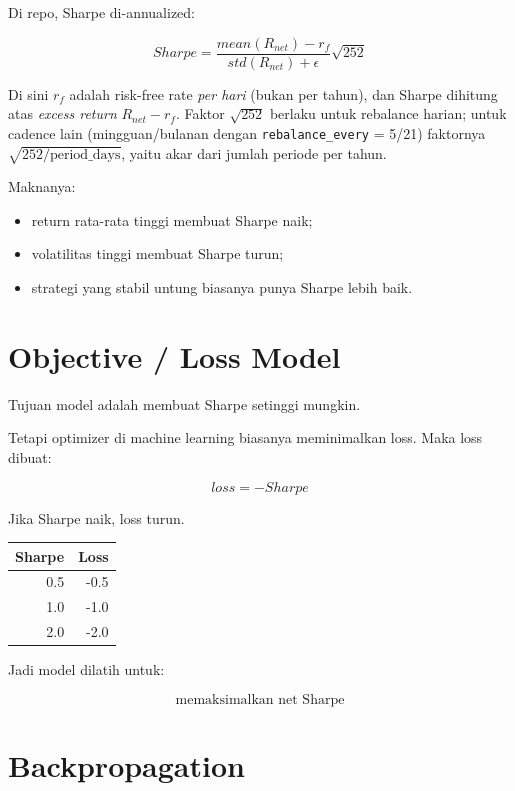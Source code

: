 \documentclass[11pt,a4paper]{article}
\begin{document}
Di repo, Sharpe di-annualized:

\[
\boxed{
Sharpe =
\frac{
mean(R_{net}) - r_f
}{
std(R_{net}) + \epsilon
}
\sqrt{252}
}
\]

Di sini \(r_f\) adalah risk-free rate \emph{per hari} (bukan per tahun), dan
Sharpe dihitung atas \emph{excess return} \(R_{net} - r_f\). Faktor \(\sqrt{252}\)
berlaku untuk rebalance harian; untuk cadence lain (mingguan/bulanan dengan
\texttt{rebalance\_every} = 5/21) faktornya \(\sqrt{252/\text{period\_days}}\),
yaitu akar dari jumlah periode per tahun.

Maknanya:

\begin{itemize}[leftmargin=*]
    \item return rata-rata tinggi membuat Sharpe naik;
    \item volatilitas tinggi membuat Sharpe turun;
    \item strategi yang stabil untung biasanya punya Sharpe lebih baik.
\end{itemize}

\section{Objective / Loss Model}

Tujuan model adalah membuat Sharpe setinggi mungkin.

Tetapi optimizer di machine learning biasanya meminimalkan loss.
Maka loss dibuat:

\[
\boxed{
loss = -Sharpe
}
\]

Jika Sharpe naik, loss turun.

\begin{center}
\begin{tabular}{rr}
\toprule
Sharpe & Loss \\
\midrule
0.5 & -0.5 \\
1.0 & -1.0 \\
2.0 & -2.0 \\
\bottomrule
\end{tabular}
\end{center}

Jadi model dilatih untuk:

\[
\boxed{
\text{memaksimalkan net Sharpe}
}
\]

\section{Backpropagation}
\end{document}
